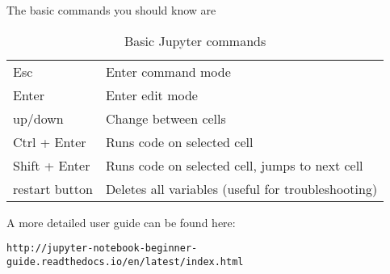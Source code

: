 \noindent The basic commands you should know are

\begin{table}[!h]
\begin{center}
\begin{tabular}{|l|l|}
\hline
Esc              & Enter command mode\\
Enter            & Enter edit mode\\
\hline
up/down          & Change between cells\\
Ctrl + Enter     & Runs code on selected cell\\
Shift + Enter    & Runs code on selected cell, jumps to next cell\\
\hline
restart button   & Deletes all variables (useful for troubleshooting)\\ 
\hline
\end{tabular}
\end{center}
\caption{\label{tb::jupyterbasiccommands}Basic Jupyter commands}
\end{table}

\noindent A more detailed user guide can be found here:

\begin{verbatim}
http://jupyter-notebook-beginner-guide.readthedocs.io/en/latest/index.html
\end{verbatim}
